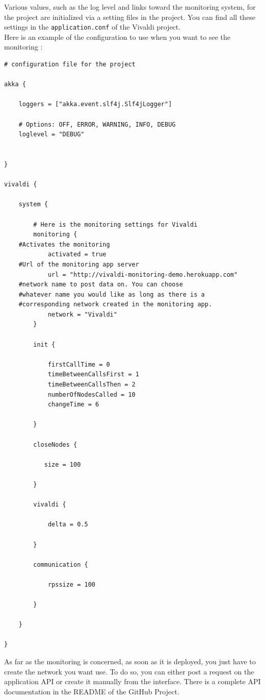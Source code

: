 \documentclass[11pt,a4paper]{article}
\begin{document}
Various values, such as the log level and links toward the monitoring system, for the project are initialized via a setting files in the project. You can find all these settings in the \texttt{application.conf} of the Vivaldi project.\\
Here is an example of the  configuration to use when you want to see the monitoring :

\begin{verbatim}
# configuration file for the project

akka {

    loggers = ["akka.event.slf4j.Slf4jLogger"]

    # Options: OFF, ERROR, WARNING, INFO, DEBUG
    loglevel = "DEBUG"


}

vivaldi {

    system {

        # Here is the monitoring settings for Vivaldi
        monitoring {
	#Activates the monitoring
            activated = true
	#Url of the monitoring app server
            url = "http://vivaldi-monitoring-demo.herokuapp.com"
	#network name to post data on. You can choose
	#whatever name you would like as long as there is a 
	#corresponding network created in the monitoring app.
            network = "Vivaldi"
        }

        init {

            firstCallTime = 0
            timeBetweenCallsFirst = 1
            timeBetweenCallsThen = 2
            numberOfNodesCalled = 10
            changeTime = 6

        }

        closeNodes {

           size = 100

        }

        vivaldi {

            delta = 0.5

        }

        communication {

            rpssize = 100

        }

    }

}
\end{verbatim}

As far as the monitoring is concerned, as soon as it is deployed, you just have to create the network you want use. To do so, you can either post a request on the application API or create it manually from the interface. There is a complete API documentation in the README of the GitHub Project. 
\end{document}
